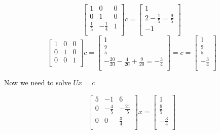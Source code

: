 \documentclass{article}
\begin{document}
$$ \begin{bmatrix}
    1 & 0 & 0 \\
    0 & 1 & 0 \\
    \frac{1}{5} & -\frac{1}{4} & 1 \\
\end{bmatrix}c = \begin{bmatrix}
    1  \\
    2  - \frac{1}{5} = \frac{9}{5} \\
    -1  \\
\end{bmatrix}$$
$$ \begin{bmatrix}
    1 & 0 & 0 \\
    0 & 1 & 0 \\
    0 & 0 & 1 \\
\end{bmatrix}c = \begin{bmatrix}
    1  \\
    \frac{9}{5} \\
    -\frac{20}{20} -\frac{4}{20} + \frac{9}{20} = -\frac{3}{4}\\
\end{bmatrix} = c = \begin{bmatrix}
    1  \\
    \frac{9}{5} \\
    -\frac{3}{4}\\
\end{bmatrix}$$

Now we need to solve $Ux = c$

$$\begin{bmatrix}
    5  & -1 & 6 \\
      0 & -\frac{4}{5} & -\frac{21}{5} \\
      0  & 0 & \frac{3}{4} \\
  \end{bmatrix}x = \begin{bmatrix}
    1  \\
    \frac{9}{5} \\
    -\frac{3}{4}\\
\end{bmatrix}$$
\end{document}
